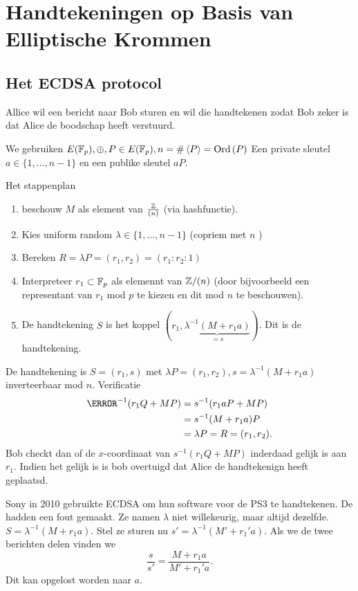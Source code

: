 
\section{Handtekeningen op Basis van Elliptische Krommen} \label{sec:handtekeningen_op_basis_van_elliptische_krommen}
\subsection{Het ECDSA protocol} \label{sec:het_ecdsa_protocol}

Allice wil een bericht naar Bob sturen en wil die handtekenen zodat Bob zeker is dat Alice de boodschap heeft verstuurd.

We gebruiken $E(\mathbb{F}_p), \oplus, P \in E(\mathbb{F}_p), n = \# \left< P \right> = \operatorname{Ord}\left(P \right) $ 
Een private sleutel $a \in \{1, \ldots, n-1\} $ en een publike sleutel $a P$.

Het stappenplan
 \begin{enumerate}
	 \item beschouw $M$ als element van $\frac{\mathbb{Z}}{(n)}$ (via hashfunctie).
	 \item Kies uniform random $\lambda \in \{1, \ldots, n - 1\} $ (copriem met $n$ )
	 \item Bereken $R = \lambda P = (r_1, r_2) = (r_1 : r_2 :1)$
	 \item Interpreteer  $r_1 \subset  \mathbb{F}_p$ als elemennt van  $\mathbb{Z} / (n)$ (door bijvoorbeeld een representant van $r_1$ mod $p$ te kiezen en dit mod $n$ te beschouwen). 
	 \item De handtekening $S$ is het koppel $(r_1, \underbrace{\lambda^{-1}(M + r_1a)}_{= s})$. 
		 Dit is de handtekening.
\end{enumerate}
De handtekening is $S = (r_1, s)$ met $\lambda P  = (r_1, r_2), s = \lambda^{-1}(M + r_1a)$ inverteerbaar  mod $n$. 
Verificatie
\begin{align*}
	\s^{-1}(r_1Q + MP) &=  s ^{-1} (r_1 a P + MP)  \\
			   &= s ^{-1} (M + r_1a)P \\
			   &= \lambda  P = R = (r_1, r_2)
.\end{align*}
Bob checkt dan of de $x$-coordinaat van $s ^{-1}(r_1 Q + MP)$ inderdaad gelijk is aan $r_1$.
Indien het gelijk is is bob overtuigd dat Alice de handtekenign heeft geplaatsd.


Sony in 2010 gebruikte ECDSA om hun software voor de PS3 te handtekenen. De hadden een fout gemaakt. Ze namen $\lambda$ niet willekeurig, maar altijd dezelfde. 
$S = \lambda ^{-1}(M + r_1a )$. Stel ze sturen nu $s' = \lambda ^{-1}(M' + r_1'a)$. 
Als we de twee berichten delen vinden we  \[
\frac{s}{s'} = \frac{M + r_1a}{M' + r_1'a}
.\] 
Dit kan opgelost worden naar $a$. 


